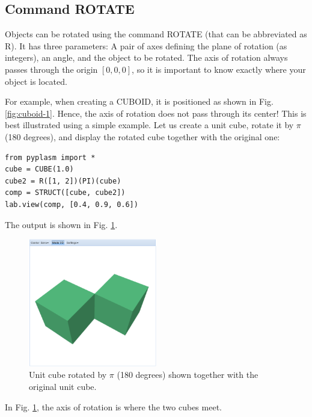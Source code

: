 \documentclass[article,A4,12pt]{llncs}
\begin{document}
\subsection{Command ROTATE}

Objects can be rotated using the command ROTATE (that
can be abbreviated as R). It has three parameters:
A pair of axes defining the plane of rotation (as integers),
an angle, and the object to be rotated. The axis of rotation 
always passes through the origin $[0, 0, 0]$, so it is important 
to know exactly where your object is located. 

For example, when creating 
a CUBOID, it is positioned as shown in Fig. \ref{fig:cuboid-1}.
Hence, the axis of rotation does not pass through its center!
This is best illustrated using a simple example. Let us create 
a unit cube, rotate it by $\pi$ (180 degrees), and display 
the rotated cube together with the original one:

\begin{verbatim}
from pyplasm import *
cube = CUBE(1.0)
cube2 = R([1, 2])(PI)(cube)
comp = STRUCT([cube, cube2])
lab.view(comp, [0.4, 0.9, 0.6])
\end{verbatim}
The output is shown in Fig. \ref{fig:rot-1}.

\newpage

\begin{figure}[!ht]
\begin{center}
\includegraphics[width=0.5\textwidth]{img/rot-1.png}
\end{center}
\vspace{-2mm}
\caption{Unit cube rotated by $\pi$ (180 degrees) shown together with the original unit cube.}
\label{fig:rot-1}
\end{figure}
\noindent
In Fig. \ref{fig:rot-1}, the axis of rotation is where the two cubes meet. 
\end{document}
